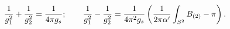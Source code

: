 \begin{equation}
{1\over g_{1}^2} + {1\over g_{2}^2}= {1\over 4\pi g_{s}};\qquad
{1\over g_{1}^2} - {1\over g_{2}^2}= {1\over 4\pi^2 g_{s}}\left(\frac{1}{2\pi\alpha'}\int_{S^2}B_{(2)}-\pi \right) .
\label{KScouplings}
\end{equation}

